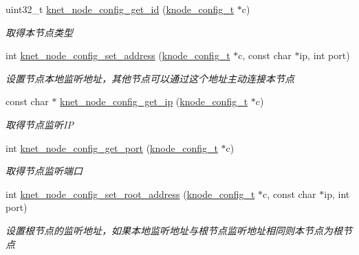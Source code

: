 \begin{DoxyCompactItemize}
uint32\+\_\+t \hyperlink{a00104_a9bc8e57e8a9cd95de718d89ef5e303ea_a9bc8e57e8a9cd95de718d89ef5e303ea}{knet\+\_\+node\+\_\+config\+\_\+get\+\_\+id} (\hyperlink{a00066_af1cfaee0eb1c76ebf06076b95cc47ee1_af1cfaee0eb1c76ebf06076b95cc47ee1}{knode\+\_\+config\+\_\+t} $\ast$c)
\begin{DoxyCompactList}\small\item\em 取得本节点类型 \end{DoxyCompactList}\item 
int \hyperlink{a00104_a8ac0b513640cb0bfd4c919441731404d_a8ac0b513640cb0bfd4c919441731404d}{knet\+\_\+node\+\_\+config\+\_\+set\+\_\+address} (\hyperlink{a00066_af1cfaee0eb1c76ebf06076b95cc47ee1_af1cfaee0eb1c76ebf06076b95cc47ee1}{knode\+\_\+config\+\_\+t} $\ast$c, const char $\ast$ip, int port)
\begin{DoxyCompactList}\small\item\em 设置节点本地监听地址，其他节点可以通过这个地址主动连接本节点 \end{DoxyCompactList}\item 
const char $\ast$ \hyperlink{a00104_ae3872a2f2a42a36c171e5e54897193b4_ae3872a2f2a42a36c171e5e54897193b4}{knet\+\_\+node\+\_\+config\+\_\+get\+\_\+ip} (\hyperlink{a00066_af1cfaee0eb1c76ebf06076b95cc47ee1_af1cfaee0eb1c76ebf06076b95cc47ee1}{knode\+\_\+config\+\_\+t} $\ast$c)
\begin{DoxyCompactList}\small\item\em 取得节点监听\+I\+P \end{DoxyCompactList}\item 
int \hyperlink{a00104_a4d6d40da8a651fcb5fff10b84c61ccb5_a4d6d40da8a651fcb5fff10b84c61ccb5}{knet\+\_\+node\+\_\+config\+\_\+get\+\_\+port} (\hyperlink{a00066_af1cfaee0eb1c76ebf06076b95cc47ee1_af1cfaee0eb1c76ebf06076b95cc47ee1}{knode\+\_\+config\+\_\+t} $\ast$c)
\begin{DoxyCompactList}\small\item\em 取得节点监听端口 \end{DoxyCompactList}\item 
int \hyperlink{a00104_a25f80200a2d66822bd506d96c67f968a_a25f80200a2d66822bd506d96c67f968a}{knet\+\_\+node\+\_\+config\+\_\+set\+\_\+root\+\_\+address} (\hyperlink{a00066_af1cfaee0eb1c76ebf06076b95cc47ee1_af1cfaee0eb1c76ebf06076b95cc47ee1}{knode\+\_\+config\+\_\+t} $\ast$c, const char $\ast$ip, int port)
\begin{DoxyCompactList}\small\item\em 设置根节点的监听地址，如果本地监听地址与根节点监听地址相同则本节点为根节点 \end{DoxyCompactList}\item 

\end{DoxyCompactItemize}
